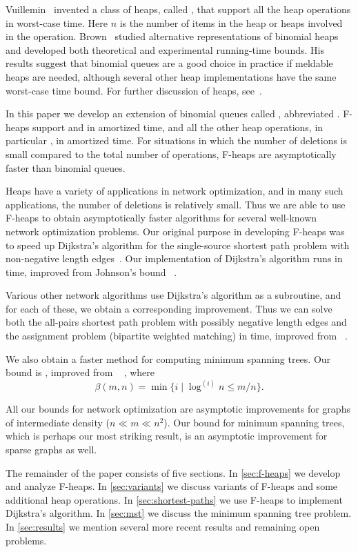 Vuillemin~\cite{Vuillemin1978} invented a class of heaps, called , that support all the heap operations in  worst-case time. Here
\(n\) is the number of items in the heap or heaps involved in the operation.
Brown~\cite{Brown1978} studied alternative representations of binomial heaps and
developed both theoretical and experimental running-time bounds. His results suggest
that binomial queues are a good choice in practice if meldable heaps are needed,
although several other heap implementations have the same  worst-case
time bound. For further discussion of heaps, see~\cite{Aho+1974,Brown1978,TAOCP3,Tarjan1983}.

In this paper we develop an extension of binomial queues called , abbreviated . F-heaps support  and
 in  amortized time, and all the other heap operations, in
particular , in  amortized time. For situations in which
the number of deletions is small compared to the total number of operations, F-heaps
are asymptotically faster than binomial queues.

Heaps have a variety of applications in network optimization, and in many such
applications, the number of deletions is relatively small. Thus we are able to use
F-heaps to obtain asymptotically faster algorithms for several well-known network
optimization problems. Our original purpose in developing F-heaps was to speed up
Dijkstra's algorithm for the single-source shortest path problem with non-negative
length edges~\cite{Dijkstra1959}. Our implementation of Dijkstra's algorithm runs in
 time, improved from Johnson's  bound~%
\cite{Johnson1977,Tarjan1983}.

Various other network algorithms use Dijkstra's algorithm as a subroutine, and for
each of these, we obtain a corresponding improvement. Thus we can solve both the
all-pairs shortest path problem with possibly negative length edges and the
assignment problem (bipartite weighted matching) in  time,
improved from ~\cite{Tarjan1983}.

We also obtain a faster method for computing minimum spanning trees. Our bound is
, improved from ~%
\cite{CheritonTarjan1976,Tarjan1983}, where \[\beta(m, n) = \min \{ i \mid \log^{(i)}
n \leq m/n \}.\]

All our bounds for network optimization are asymptotic improvements for graphs of
intermediate density (\(n \ll m \ll n^2\)). Our bound for minimum spanning trees,
which is perhaps our most striking result, is an asymptotic improvement for sparse
graphs as well.

The remainder of the paper consists of five sections. In \autoref{sec:f-heaps} we
develop and analyze F-heaps. In \autoref{sec:variants} we discuss variants of F-heaps
and some additional heap operations. In \autoref{sec:shortest-paths} we use F-heaps
to implement Dijkstra's algorithm. In \autoref{sec:mst} we discuss the minimum
spanning tree problem. In \autoref{sec:results} we mention several more recent
results and remaining open problems.

